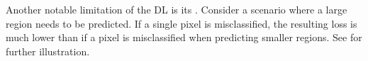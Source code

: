 Another notable limitation of the \ac{DL} is its . Consider a scenario where a large region needs to be predicted. If a single pixel is misclassified, the resulting loss is much lower than if a pixel is misclassified when predicting smaller regions. See  for further illustration.
\begin{figure}[H]%
  \centering

\end{figure}
